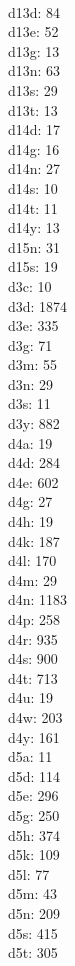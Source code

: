 \begin{multicols}{8}
  \\ d13d: 84
  \\ d13e: 52
  \\ d13g: 13
  \\ d13n: 63
  \\ d13s: 29
  \\ d13t: 13
  \\ d14d: 17
  \\ d14g: 16
  \\ d14n: 27
  \\ d14s: 10
  \\ d14t: 11
  \\ d14y: 13
  \\ d15n: 31
  \\ d15s: 19
  \\ d3c: 10
  \\ d3d: 1874
  \\ d3e: 335
  \\ d3g: 71
  \\ d3m: 55
  \\ d3n: 29
  \\ d3s: 11
  \\ d3y: 882
  \\ d4a: 19
  \\ d4d: 284
  \\ d4e: 602
  \\ d4g: 27
  \\ d4h: 19
  \\ d4k: 187
  \\ d4l: 170
  \\ d4m: 29
  \\ d4n: 1183
  \\ d4p: 258
  \\ d4r: 935
  \\ d4s: 900
  \\ d4t: 713
  \\ d4u: 19
  \\ d4w: 203
  \\ d4y: 161
  \\ d5a: 11
  \\ d5d: 114
  \\ d5e: 296
  \\ d5g: 250
  \\ d5h: 374
  \\ d5k: 109
  \\ d5l: 77
  \\ d5m: 43
  \\ d5n: 209
  \\ d5s: 415
  \\ d5t: 305

\end{multicols}
